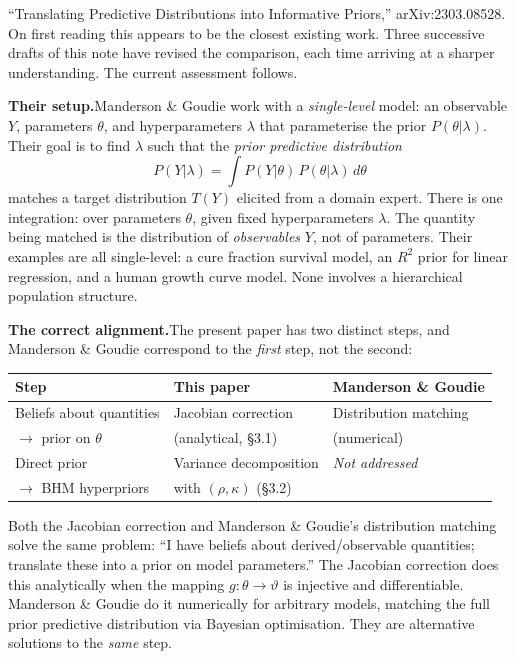 \documentclass[12pt,a4paper]{article}
\begin{document}
``Translating Predictive Distributions into Informative Priors,''
arXiv:2303.08528. On first reading this appears to be the closest existing
work. Three successive drafts of this note have revised the comparison, each
time arriving at a sharper understanding. The current assessment follows.

\medskip
\noindent\textbf{Their setup.}\quad Manderson \& Goudie work with a
\emph{single-level} model: an observable $Y$, parameters $\theta$, and
hyperparameters $\lambda$ that parameterise the prior $P(\theta|\lambda)$.
Their goal is to find $\lambda$ such that the \emph{prior predictive
distribution}
\[
  P(Y|\lambda) = \int P(Y|\theta)\, P(\theta|\lambda)\, d\theta
\]
matches a target distribution $T(Y)$ elicited from a domain expert. There is
one integration: over parameters $\theta$, given fixed hyperparameters
$\lambda$. The quantity being matched is the distribution of \emph{observables}
$Y$, not of parameters. Their examples are all single-level: a cure fraction
survival model, an $R^2$ prior for linear regression, and a human growth curve
model. None involves a hierarchical population structure.

\medskip
\noindent\textbf{The correct alignment.}\quad The present paper has two
distinct steps, and Manderson \& Goudie correspond to the \emph{first} step,
not the second:

\begin{center}
\begin{tabular}{lll}
\toprule
\textbf{Step} & \textbf{This paper} & \textbf{Manderson \& Goudie} \\
\midrule
Beliefs about quantities & Jacobian correction & Distribution matching \\
$\to$ prior on $\theta$ & (analytical, \S3.1) & (numerical) \\
\addlinespace
Direct prior & Variance decomposition & \emph{Not addressed} \\
$\to$ BHM hyperpriors & with $(\rho, \kappa)$ (\S3.2) & \\
\bottomrule
\end{tabular}
\end{center}

Both the Jacobian correction and Manderson \& Goudie's distribution matching
solve the same problem: ``I have beliefs about derived/observable quantities;
translate these into a prior on model parameters.'' The Jacobian correction does
this analytically when the mapping $g: \theta \to \vartheta$ is injective and
differentiable. Manderson \& Goudie do it numerically for arbitrary models,
matching the full prior predictive distribution via Bayesian optimisation. They
are alternative solutions to the \emph{same} step.
\end{document}
